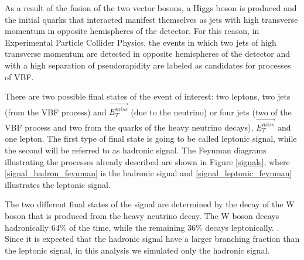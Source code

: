 As a result of the fusion of the two vector bosons, a Higgs boson is produced and the initial quarks that interacted manifest themselves as jets with high transverse momentum in opposite
hemispheres of the detector. For this reason, in Experimental Particle Collider Physics, the events in which two jets of high transverse momentum are detected in opposite hemispheres of the detector 
and with a high separation of pseudorapidity are labeled as candidates for processes of VBF. 

There are two possible final states of the event of interest: two leptons, two jets (from the VBF process) and $\vec{E_T^{miss}}$ (due to the neutrino) or four jets (two of the VBF process and two from the quarks of the heavy neutrino decays), $\vec{E_T^{miss}}$ and one lepton. The first type of final state is going to be called leptonic signal, while the second will be referred to as hadronic signal. The Feynman diagrams illustrating the processes already described are shown in Figure \ref{signals}, where \ref{signal_hadron_feynman} is the hadronic signal and \ref{signal_leptonic_feynman} illustrates the leptonic signal. 

The two different final states of the signal are determined by the decay of the W boson that is produced from the heavy neutrino decay. The W boson decays hadronically 64\% of the time, while the remaining 36\% decays leptonically. \cite{Tesis_luis_alfredo}. Since it is expected that the hadronic signal have a larger branching fraction than the leptonic signal, in this analysis we simulated only the hadronic signal.


